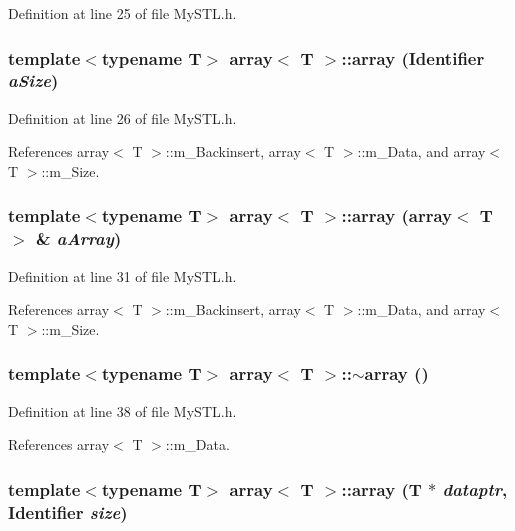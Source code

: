 Definition at line 25 of file MySTL.h.

\subsubsection[{array}]{\setlength{\rightskip}{0pt plus 5cm}template$<$typename T$>$ {\bf array}$<$ T $>$::{\bf array} ({\bf Identifier} {\em aSize})}\label{classarray_a093b48b6689a9c485d9916d2f0e892f3}


Definition at line 26 of file MySTL.h.



References array$<$ T $>$::m\_\-Backinsert, array$<$ T $>$::m\_\-Data, and array$<$ T $>$::m\_\-Size.

\subsubsection[{array}]{\setlength{\rightskip}{0pt plus 5cm}template$<$typename T$>$ {\bf array}$<$ T $>$::{\bf array} ({\bf array}$<$ T $>$ \& {\em aArray})}\label{classarray_a59e916c1d1edc5ac1905d2d2efdfed6c}


Definition at line 31 of file MySTL.h.



References array$<$ T $>$::m\_\-Backinsert, array$<$ T $>$::m\_\-Data, and array$<$ T $>$::m\_\-Size.

\subsubsection[{$\sim$array}]{\setlength{\rightskip}{0pt plus 5cm}template$<$typename T$>$ {\bf array}$<$ T $>$::$\sim${\bf array} ()}\label{classarray_a9b08050d554bbdf83747443ce4b8b819}


Definition at line 38 of file MySTL.h.



References array$<$ T $>$::m\_\-Data.

\subsubsection[{array}]{\setlength{\rightskip}{0pt plus 5cm}template$<$typename T$>$ {\bf array}$<$ T $>$::{\bf array} (T $\ast$ {\em dataptr}, \/  {\bf Identifier} {\em size})}\label{classarray_abbd410f20c8850c8883f36daf76f011e}



